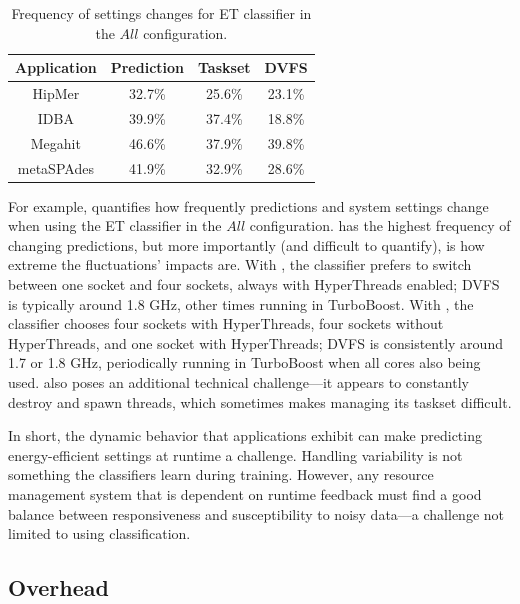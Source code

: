 \begin{table}[t]
\caption{Frequency of settings changes for ET classifier in the $All$ configuration.}
\label{tbl:classifiers-actuation}
\small
\centering
\begin{tabular}{cccc}
  \textbf{Application} & \textbf{Prediction} & \textbf{Taskset} & \textbf{DVFS} \\
  \hline
  \hline
  HipMer     & 32.7\% & 25.6\% & 23.1\% \\
  IDBA       & 39.9\% & 37.4\% & 18.8\% \\
  Megahit    & 46.6\% & 37.9\% & 39.8\% \\
  metaSPAdes & 41.9\% & 32.9\% & 28.6\% \\
  \hline
  \hline
\end{tabular}
\end{table}

For example,  quantifies how frequently predictions and system settings change when using the ET classifier in the $All$ configuration.
 has the highest frequency of changing predictions, but more importantly (and difficult to quantify), is how extreme the fluctuations' impacts	 are.
With , the classifier prefers to switch between one socket and four sockets, always with HyperThreads enabled; DVFS is typically around 1.8 GHz, other times running in TurboBoost.
With , the classifier chooses four sockets with HyperThreads, four sockets without HyperThreads, and one socket with HyperThreads; DVFS is consistently around 1.7 or 1.8 GHz, periodically running in TurboBoost when all cores also being used.
 also poses an additional technical challenge---it appears to constantly destroy and spawn threads, which sometimes makes managing its taskset difficult.

In short, the dynamic behavior that applications exhibit can make predicting energy-efficient settings at runtime a challenge.
Handling variability is not something the classifiers learn during training.
However, any resource management system that is dependent on runtime feedback must find a good balance between responsiveness and susceptibility to noisy data---a challenge not limited to using classification.


\subsection{Overhead}
\label{sec:classifiers-eval-overhead}

